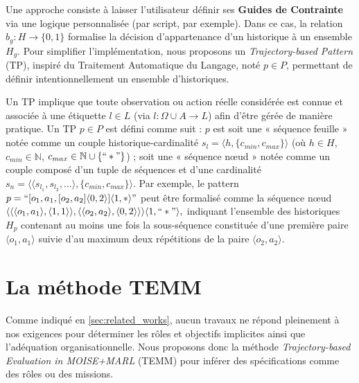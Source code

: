 \documentclass[final]{jfsma}
\begin{document}
Une approche consiste à laisser l'utilisateur définir ses \textbf{Guides de Contrainte} via une logique personnalisée (par script, par exemple). Dans ce cas, la relation \(b_g: H \to \{0,1\}\) formalise la décision d'appartenance d'un historique à un ensemble \(H_g\).
Pour simplifier l'implémentation, nous proposons un \textit{Trajectory-based Pattern} (TP), inspiré du Traitement Automatique du Langage, noté \(p \in P\), permettant de définir intentionnellement un ensemble d'historiques.

Un TP implique que toute observation ou action réelle considérée est connue et associée à une étiquette \(l \in L\) (via \(l: \Omega \cup A \to L\)) afin d'être gérée de manière pratique. Un TP \(p \in P\) est défini comme suit : \(p\) est soit une « séquence feuille » notée comme un couple historique-cardinalité \(s_l = \langle h, \{c_{min}, c_{max}\} \rangle\) (où \(h \in H\), \(c_{min} \in \mathbb{N}\), \(c_{max} \in \mathbb{N} \cup \{``*"\}\)) ; soit une « séquence nœud » notée comme un couple composé d'un tuple de séquences et d'une cardinalité \(s_n = \langle \langle s_{l_1}, s_{l_2}, \dots \rangle, \{c_{min}, c_{max}\} \rangle\). Par exemple, le pattern
$
  p = ``[o_1,a_1,[o_2,a_2]\langle0,2\rangle]\langle1,*\rangle"
$
peut être formalisé comme la séquence nœud
$
  \langle \langle \langle o_1,a_1\rangle,\langle 1,1 \rangle \rangle, \langle \langle o_2,a_2\rangle,\langle 0,2 \rangle \rangle \rangle \langle 1,``*"\rangle,
$
indiquant l'ensemble des historiques \(H_p\) contenant au moins une fois la sous-séquence constituée d'une première paire \(\langle o_1,a_1\rangle\) suivie d'au maximum deux répétitions de la paire \(\langle o_2,a_2\rangle\).


\section{La méthode TEMM}
\label{sec:TEMM_algorithm}

Comme indiqué en \autoref{sec:related_works}, aucun travaux ne répond pleinement à nos exigences pour déterminer les rôles et objectifs implicites ainsi que l'adéquation organisationnelle. Nous proposons donc la méthode \textit{Trajectory-based Evaluation in MOISE+MARL} (TEMM) pour inférer des spécifications comme des rôles ou des missions.
\end{document}

